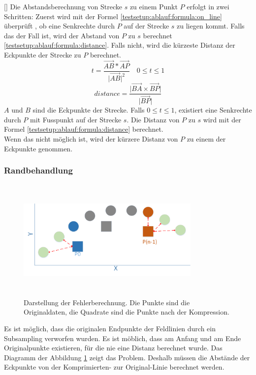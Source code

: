 [\baselineskip]
Die Abstandsberechnung von Strecke $s$ zu einem Punkt $P$ erfolgt in zwei Schritten: Zuerst wird mit der Formel \eqref{testsetup:ablauf:formula:on_line} überprüft  , ob eine Senkrechte durch $P$ auf der Strecke $s$ zu liegen kommt. Falls das der Fall ist, wird der Abstand von $P$ zu $s$ berechnet \eqref{testsetup:ablauf:formula:distance}. Falls nicht, wird die kürzeste Distanz der Eckpunkte der Strecke zu $P$ berechnet.\\
\begin{equation} \label{testsetup:ablauf:formula:on_line}
 t = \frac{\vec{AB}*\vec{AP}}{\lvert \vec{AB}\rvert ^2} \quad 0 \leq t \leq 1
\end{equation}
\begin{equation}\label{testsetup:ablauf:formula:distance}
distance = \frac{\lvert \vec{BA}\times \vec{BP}\rvert}{\lvert \vec{BP} \rvert}
\end{equation}
$A$ und $B$ sind die Eckpunkte der Strecke. Falls $0 \leq t \leq 1$, existiert eine Senkrechte durch $P$ mit Fusspunkt auf der Strecke $s$. Die Distanz von $P$ zu $s$ wird mit der Formel \eqref{testsetup:ablauf:formula:distance} berechnet.\\
Wenn das nicht möglich ist, wird der kürzere Distanz von $P$ zu einem der Eckpunkte genommen. 

\subsubsection{Randbehandlung}
\begin{figure}[!htbp]
	\center
	\includegraphics[width=0.8\textwidth,height=6cm,keepaspectratio]{./pictures/testsetup/randbehandlung.png}
	\caption{Darstellung der Fehlerberechnung. Die Punkte sind die Originaldaten, die Quadrate sind die Punkte nach der Kompression.}
	\label{testsetup:ablauf:randbehandlung:diagramm}
\end{figure}
Es ist möglich, dass die originalen Endpunkte der Feldlinien durch ein Subsampling verworfen wurden. Es ist möblich, dass am Anfang und am Ende Originalpunkte existieren, für die nie eine Distanz berechnet wurde. Das Diagramm der Abbildung \ref{testsetup:ablauf:randbehandlung:diagramm} zeigt das Problem. Deshalb müssen die Abstände der Eckpunkte von der Komprimierten- zur Original-Linie berechnet werden.

